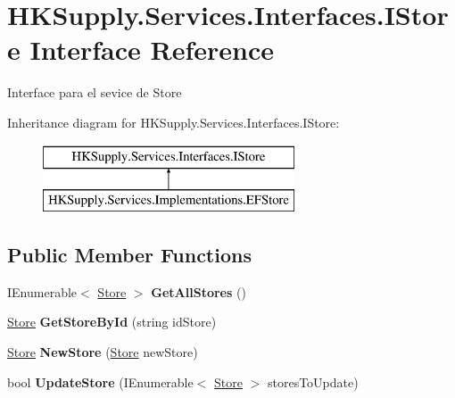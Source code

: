 \hypertarget{interface_h_k_supply_1_1_services_1_1_interfaces_1_1_i_store}{}\section{H\+K\+Supply.\+Services.\+Interfaces.\+I\+Store Interface Reference}
\label{interface_h_k_supply_1_1_services_1_1_interfaces_1_1_i_store}


Interface para el sevice de Store  


Inheritance diagram for H\+K\+Supply.\+Services.\+Interfaces.\+I\+Store\+:\begin{figure}[H]
\begin{center}
\leavevmode
\includegraphics[height=2.000000cm]{interface_h_k_supply_1_1_services_1_1_interfaces_1_1_i_store}
\end{center}
\end{figure}
\subsection*{Public Member Functions}
\begin{DoxyCompactItemize}
\item 
\mbox{\label{interface_h_k_supply_1_1_services_1_1_interfaces_1_1_i_store_a9f063b0e41c6815010ca37e29ed823d6}} 
I\+Enumerable$<$ \mbox{\hyperlink{class_h_k_supply_1_1_models_1_1_store}{Store}} $>$ {\bfseries Get\+All\+Stores} ()
\item 
\mbox{\label{interface_h_k_supply_1_1_services_1_1_interfaces_1_1_i_store_ae14c258d604aa8c5b530642b9707de20}} 
\mbox{\hyperlink{class_h_k_supply_1_1_models_1_1_store}{Store}} {\bfseries Get\+Store\+By\+Id} (string id\+Store)
\item 
\mbox{\label{interface_h_k_supply_1_1_services_1_1_interfaces_1_1_i_store_a20a00f1cd6130e4acbda7212c9f1edf3}} 
\mbox{\hyperlink{class_h_k_supply_1_1_models_1_1_store}{Store}} {\bfseries New\+Store} (\mbox{\hyperlink{class_h_k_supply_1_1_models_1_1_store}{Store}} new\+Store)
\item 
\mbox{\label{interface_h_k_supply_1_1_services_1_1_interfaces_1_1_i_store_a9329bc091edb5e15a3ebf32222d85d5a}} 
bool {\bfseries Update\+Store} (I\+Enumerable$<$ \mbox{\hyperlink{class_h_k_supply_1_1_models_1_1_store}{Store}} $>$ stores\+To\+Update)
\end{DoxyCompactItemize}



